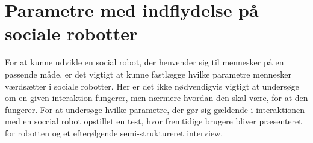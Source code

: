 \chapter{Parametre med indflydelse på sociale robotter}
\label{ParametreSocialeRobotter}
%
For at kunne udvikle en social robot, der henvender sig til mennesker på en passende måde, er det vigtigt at kunne fastlægge hvilke parametre mennesker værdsætter i sociale robotter. Her er det ikke nødvendigvis vigtigt at undersøge om en given interaktion fungerer, men nærmere hvordan den skal være, for at den fungerer. For at undersøge hvilke parametre, der gør sig gældende i interaktionen med en soccial robot opstillet en test, hvor fremtidige brugere bliver præsenteret for robotten og et efterølgende semi-struktureret interview.